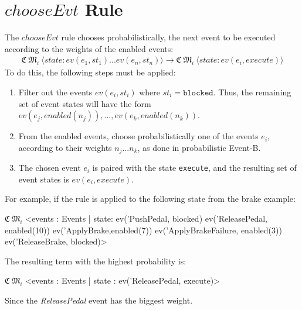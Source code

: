 \section{$chooseEvt$ Rule}
The $chooseEvt$ rule chooses probabilistically, the next event to be executed according to the weights of the enabled events:
\begin{align*}
    \mathfrak{C} \ \mathfrak{M}_i \ \langle state: ev(e_1,st_1) ... ev(e_n, st_n) \rangle \rightarrow 
    \mathfrak{C} \ \mathfrak{M}_i \ \langle state: ev(e_i, execute) \rangle
\end{align*}
To do this, the following steps must be applied:
\begin{enumerate}
    \item Filter out the events $ev(e_i, st_i)$ where $st_i = \texttt{blocked}$. Thus, the remaining set of event states will have the form $ev(e_j, enabled(n_j)),...,ev(e_k, enabled(n_k))$.
    \item From the enabled events, choose probabilistically one of the events $e_i$, according to their weights $n_j...n_k$, as done in probabilistic Event-B.
    \item The chosen event $e_i$ is paired with the state \texttt{execute}, and the resulting set of event states is $ev(e_i, execute)$.
\end{enumerate}
For example, if the rule is applied to the following state from the brake example:
\begin{maude}

$\mathfrak{C} \ \mathfrak{M}_i$ <events : Events | state: ev('PushPedal, blocked) 
                               ev('ReleasePedal, enabled(10)) 
                               ev('ApplyBrake,enabled(7)) 
                               ev('ApplyBrakeFailure, enabled(3))
                               ev('ReleaseBrake, blocked)>
\end{maude}
The resulting term with the highest probability is:
\begin{maude}

$\mathfrak{C} \ \mathfrak{M}_i$ <events : Events | state : ev('ReleasePedal, execute)>
\end{maude}
Since the \textit{ReleasePedal} event has the biggest weight.

